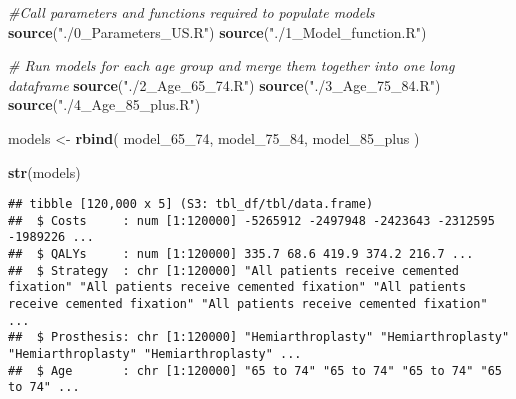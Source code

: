\documentclass[
]{article}
\newenvironment{Shaded}{\begin{snugshade}}{\end{snugshade}}
\newcommand{\CommentTok}[1]{\textcolor[rgb]{0.56,0.35,0.01}{\textit{#1}}}
\newcommand{\FunctionTok}[1]{\textcolor[rgb]{0.13,0.29,0.53}{\textbf{#1}}}
\newcommand{\NormalTok}[1]{#1}
\newcommand{\OtherTok}[1]{\textcolor[rgb]{0.56,0.35,0.01}{#1}}
\newcommand{\StringTok}[1]{\textcolor[rgb]{0.31,0.60,0.02}{#1}}
\begin{document}
\begin{Shaded}
\begin{Highlighting}[]
\CommentTok{\#Call parameters and functions required to populate models}
\FunctionTok{source}\NormalTok{(}\StringTok{"./0\_Parameters\_US.R"}\NormalTok{)}
\FunctionTok{source}\NormalTok{(}\StringTok{"./1\_Model\_function.R"}\NormalTok{)}

\CommentTok{\# Run models for each age group and merge them together into one long dataframe}
\FunctionTok{source}\NormalTok{(}\StringTok{"./2\_Age\_65\_74.R"}\NormalTok{)}
\FunctionTok{source}\NormalTok{(}\StringTok{"./3\_Age\_75\_84.R"}\NormalTok{)}
\FunctionTok{source}\NormalTok{(}\StringTok{"./4\_Age\_85\_plus.R"}\NormalTok{)}

\NormalTok{models }\OtherTok{\textless{}{-}} \FunctionTok{rbind}\NormalTok{(}
\NormalTok{  model\_65\_74,}
\NormalTok{  model\_75\_84,}
\NormalTok{  model\_85\_plus}
\NormalTok{)}

\FunctionTok{str}\NormalTok{(models)}
\end{Highlighting}
\end{Shaded}

\begin{verbatim}
## tibble [120,000 x 5] (S3: tbl_df/tbl/data.frame)
##  $ Costs     : num [1:120000] -5265912 -2497948 -2423643 -2312595 -1989226 ...
##  $ QALYs     : num [1:120000] 335.7 68.6 419.9 374.2 216.7 ...
##  $ Strategy  : chr [1:120000] "All patients receive cemented fixation" "All patients receive cemented fixation" "All patients receive cemented fixation" "All patients receive cemented fixation" ...
##  $ Prosthesis: chr [1:120000] "Hemiarthroplasty" "Hemiarthroplasty" "Hemiarthroplasty" "Hemiarthroplasty" ...
##  $ Age       : chr [1:120000] "65 to 74" "65 to 74" "65 to 74" "65 to 74" ...
\end{verbatim}
\end{document}
